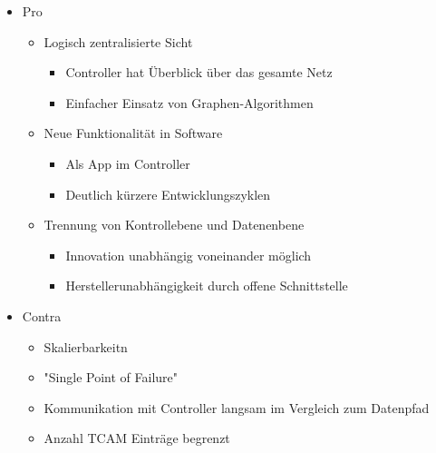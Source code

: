       \begin{itemize}
        \item Pro
          \begin{itemize}
            \item Logisch zentralisierte Sicht
              \begin{itemize}
                \item Controller hat Überblick über das gesamte Netz
                \item Einfacher Einsatz von Graphen-Algorithmen
              \end{itemize}
            \item Neue Funktionalität in Software
              \begin{itemize}
                \item Als App im Controller
                \item Deutlich kürzere Entwicklungszyklen
              \end{itemize}
            \item Trennung von Kontrollebene und Datenenbene
              \begin{itemize}
                \item Innovation unabhängig voneinander möglich
                \item Herstellerunabhängigkeit durch offene Schnittstelle
              \end{itemize}
          \end{itemize}
        \item Contra
          \begin{itemize}
            \item Skalierbarkeitn
            \item "Single Point of Failure"
            \item Kommunikation mit Controller langsam im Vergleich zum Datenpfad
            \item Anzahl TCAM Einträge begrenzt
          \end{itemize}
      \end{itemize}
